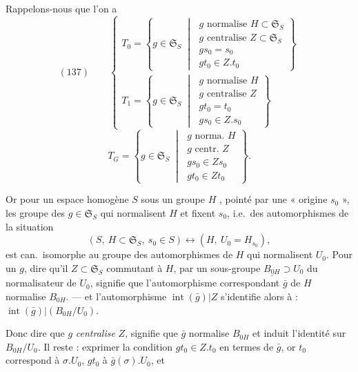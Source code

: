 \documentclass[11pt,a4paper]{article}
\begin{document}
Rappelons-nous que l'on a
\[
(137)\qquad
\begin{cases}
T_0=\left\{g\in\mathfrak{S}_S \;\middle|\;
\begin{array}{l}
g \text{ normalise } H\subset\mathfrak{S}_S\\
g \text{ centralise } Z\subset\mathfrak{S}_S\\
gs_0=s_0\\
gt_0\in Z.t_0
\end{array}\right\}\\[4ex]
T_1=\left\{g\in\mathfrak{S}_S \;\middle|\;
\begin{array}{l}
g \text{ normalise } H\\
g \text{ centralise } Z\\
gt_0=t_0\\
gs_0\in Z.s_0
\end{array}\right\}
\end{cases}
\]
\[
T_G=\left\{g\in\mathfrak{S}_S \;\middle|\;
\begin{array}{l}
g \text{ norma. } H\\
g \text{ centr. } Z\\
gs_0\in Zs_0\\
gt_0\in Zt_0
\end{array}\right\}.
\]

Or pour un espace homogène $S$ sous un groupe $H$ , pointé par une
« origine $s_0$ », les groupe des $g\in\mathfrak{S}_S$ qui normalisent $H$ et fixent $s_0$,
i.e.\ des automorphismes de la situation
\[
(S,\ H\subset\mathfrak{S}_S,\ s_0\in S)\longleftrightarrow(H,\ U_0=H_{s_0}),
\]
est can.\ isomorphe au groupe des automorphismes  de $H$ qui
 normalisent $U_0$. \struck{\ill{}} Pour un \struck{\ill{}} $g$, dire qu'il
 
$Z\subset\mathfrak{S}_S$ commutant à $H$,  par un sous-groupe
$\underline{B_{0H}}\supset U_0$ du normalisateur de $U_0$, \ill{} signifie que
l'automorphisme correspondant $\bar g$ de $H$ normalise $B_{0H}$. --- et
l'automorphisme $\operatorname{int}(\bar g)|Z$ \struck{\ill{}} s'identifie alors à :
$\operatorname{int}(\bar g)|(B_{0H}/U_0)$.

Donc dire que $g$ \emph{centralise} $Z$, signifie que $\bar g$ normalise $B_{0H}$ et
induit l'identité sur $B_{0H}/U_0$. Il reste : exprimer la condition $gt_0\in Z.t_0$
en termes de $\bar g$, or  $t_0$ correspond à $\sigma.U_0$, $gt_0$ à
$\bar g(\sigma).U_0$, et  
\end{document}
